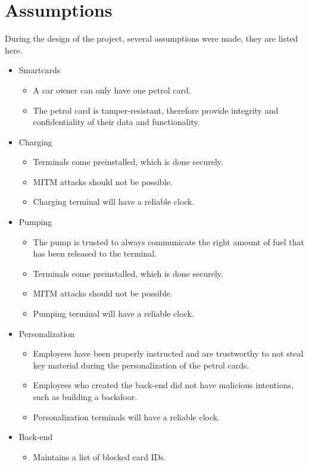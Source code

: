 \section{Assumptions}
During the design of the project, several assumptions were made, they are listed here.
\begin{itemize}
\item Smartcards
\begin{itemize}
	\item A car owner can only have one petrol card.
	\item The petrol card is tamper-resistant, therefore provide integrity and confidentiality of their data and functionality.
\end{itemize}

\item Charging
\begin{itemize}
\item Terminals come preinstalled, which is done securely.
\item MITM attacks should not be possible.
\item Charging terminal will have a reliable clock.
\end{itemize}


\item Pumping
\begin{itemize}
\item The pump is trusted to always communicate the right amount of fuel that has been released to the terminal.
\item Terminals come preinstalled, which is done securely.
\item MITM attacks should not be possible.
\item Pumping terminal will have a reliable clock.
\end{itemize}

 
\item Personalization
\begin{itemize}
\item Employees have been properly instructed and are trustworthy to not steal key material during the personalization of the petrol cards.
\item Employees who created the back-end did not have malicious intentions, such as building a backdoor.
\item Personalization terminals will have a reliable clock.
\end{itemize}

\item Back-end
\begin{itemize}
\item Maintains a list of blocked card IDs.
\end{itemize}
\end{itemize}

 
